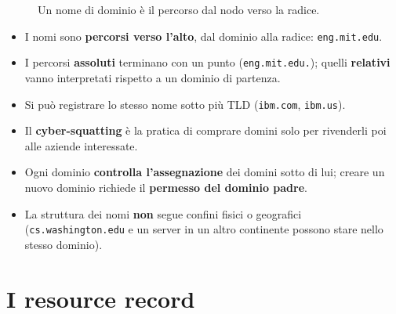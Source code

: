 \begin{figure}[H]
\centering
{}
\caption{Un nome di dominio è il percorso dal nodo verso la radice.}
\end{figure}

\begin{itemize}
    \item I nomi sono \textbf{percorsi verso l'alto}, dal dominio alla radice: \texttt{eng.mit.edu}.
    \item I percorsi \textbf{assoluti} terminano con un punto (\texttt{eng.mit.edu.}); quelli
          \textbf{relativi} vanno interpretati rispetto a un dominio di partenza.
    \item Si può registrare lo stesso nome sotto più TLD (\texttt{ibm.com}, \texttt{ibm.us}).
    \item Il \textbf{cyber-squatting} è la pratica di comprare domini solo per rivenderli poi alle aziende interessate.
    \item Ogni dominio \textbf{controlla l'assegnazione} dei domini sotto di lui; creare un nuovo dominio richiede
          il \textbf{permesso del dominio padre}.
    \item La struttura dei nomi \textbf{non} segue confini fisici o geografici (\texttt{cs.washington.edu} e un
          server in un altro continente possono stare nello stesso dominio).
\end{itemize}

\section{I resource record}

